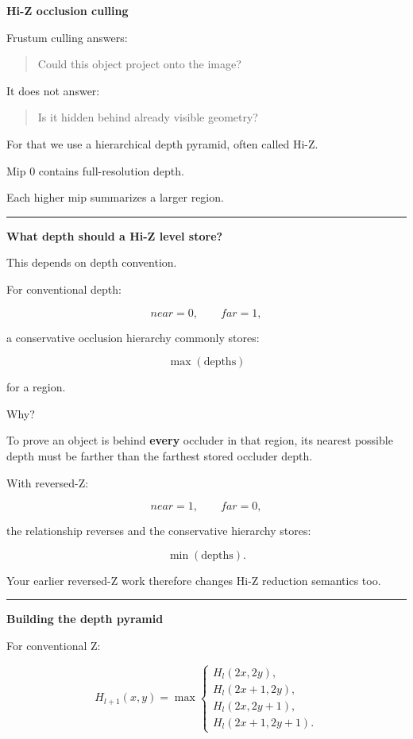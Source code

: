 \textbf{Hi-Z occlusion culling}

Frustum culling answers:

\begin{quote}
Could this object project onto the image?
\end{quote}

It does not answer:

\begin{quote}
Is it hidden behind already visible geometry?
\end{quote}

For that we use a hierarchical depth pyramid, often called Hi-Z.

Mip 0 contains full-resolution depth.

Each higher mip summarizes a larger region.

\begin{center}\rule{0.5\linewidth}{0.5pt}\end{center}

\textbf{What depth should a Hi-Z level store?}

This depends on depth convention.

For conventional depth:

\[
near=0,
\qquad
far=1,
\]

a conservative occlusion hierarchy commonly stores:

\[
\boxed{
\max(\text{depths})
}
\]

for a region.

Why?

To prove an object is behind \textbf{every} occluder in that region, its nearest possible depth must be farther than the farthest stored occluder depth.

With reversed-Z:

\[
near=1,
\qquad
far=0,
\]

the relationship reverses and the conservative hierarchy stores:

\[
\boxed{
\min(\text{depths})
}.
\]

Your earlier reversed-Z work therefore changes Hi-Z reduction semantics too.

\begin{center}\rule{0.5\linewidth}{0.5pt}\end{center}

\textbf{Building the depth pyramid}

For conventional Z:

\[
H_{l+1}(x,y)
=
\max
\begin{cases}
H_l(2x,2y),\\
H_l(2x+1,2y),\\
H_l(2x,2y+1),\\
H_l(2x+1,2y+1).
\end{cases}
\]

